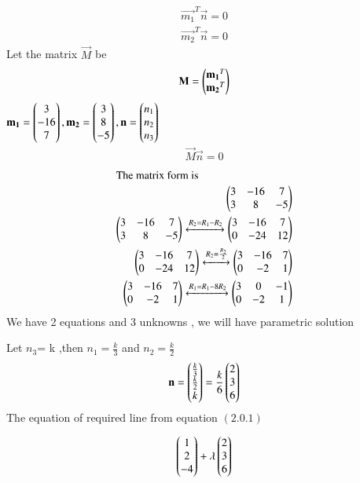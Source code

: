 \documentclass[journal,12pt,twocolumn]{IEEEtran}
\begin{document}
\begin{align}
 \vec{m_1}^T  \vec{n} = 0   
\end{align}
\begin{align}
\vec{m_2}^T\vec{n} = 0    
\end{align}
Let the matrix $\vec{M}$ be
\begin{align}
	\mathbf{M}=\begin{pmatrix}\mathbf{m_1}^T\\\mathbf{m_2}^T\end{pmatrix}
\end{align}
$\mathbf{m_1}=\begin{pmatrix}3\\-16\\7\end{pmatrix} ,  \mathbf{m_2}=\begin{pmatrix}3\\8\\-5\end{pmatrix},\mathbf{n}=\begin{pmatrix}n_1\\n_2\\n_3\end{pmatrix} $
\begin{align}
	\vec{M}\vec{n}=0
\end{align}
\begin{align}
	\intertext{The matrix form is}
	\begin{pmatrix}3 & -16 & 7 \\ 3 & 8 & -5\end{pmatrix}\\
	\begin{pmatrix}3 & -16 & 7 \\ 3 & 8 & -5 \end{pmatrix} \xleftrightarrow{R_2=R_1-R_2}\begin{pmatrix}3 & -16 & 7 \\ 0 & -24 & 12 \end{pmatrix}\\
	\begin{pmatrix}3 & -16 & 7 \\ 0 & -24 & 12\end{pmatrix}\xleftrightarrow{R_2=\frac{R_2}{2}}\begin{pmatrix}3 & -16 & 7 \\ 0 & -2 & 1 \end{pmatrix}\\
	\begin{pmatrix}3 & -16 & 7 \\ 0 & -2 & 1 \end{pmatrix}\xleftrightarrow{R_1=R_1 -8R_2}\begin{pmatrix}3 & 0 & -1 \\ 0 & -2 & 1\end{pmatrix}
\end{align}
We have 2 equations and 3 unknowns , we will have parametric solution\par
Let $n_3$= k ,then $n_1 =  \frac{k}{3}$ and $n_2 =  \frac{k}{2}$
\begin{align}
	\mathbf{n} = \begin{pmatrix}\frac{k}{3} \\ \frac{k}{2} \\k\end{pmatrix} =\frac{k}{6} \begin{pmatrix}2 \\ 3 \\6\end{pmatrix}
\end{align}
The equation of required line from equation $(2.0.1)$ \par
\begin{align}
	\begin{pmatrix}1\\2\\-4\end{pmatrix} + \lambda\begin{pmatrix}2\\3\\6\end{pmatrix} 
\end{align}
\end{document}
